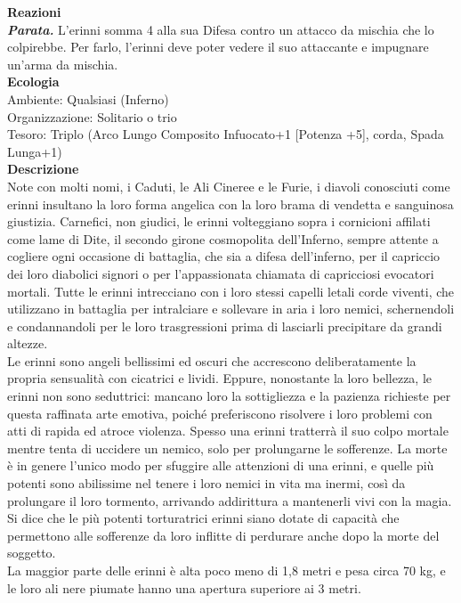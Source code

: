 \begin{multicols}{2}
\textbf{Reazioni}\\
\emph{\textbf{Parata.}} L'erinni somma 4 alla sua Difesa contro un attacco da mischia che lo colpirebbe. Per farlo, l'erinni deve poter vedere il suo attaccante e impugnare un'arma da mischia.\\
\textbf{Ecologia}\\
Ambiente: Qualsiasi (Inferno)\\
Organizzazione: Solitario o trio\\
Tesoro: Triplo (Arco Lungo Composito Infuocato+1 [Potenza +5], corda, Spada Lunga+1)\\
\textbf{Descrizione}\\
Note con molti nomi, i Caduti, le Ali Cineree e le Furie, i diavoli conosciuti come erinni insultano la loro forma angelica con la loro brama di vendetta e sanguinosa giustizia. Carnefici, non giudici, le erinni volteggiano sopra i cornicioni affilati come lame di Dite, il secondo girone cosmopolita dell’Inferno, sempre attente a cogliere ogni occasione di battaglia, che sia a difesa dell’inferno, per il capriccio dei loro diabolici signori o per l’appassionata chiamata di capricciosi evocatori mortali. Tutte le erinni intrecciano con i loro stessi capelli letali corde viventi, che utilizzano in battaglia per intralciare e sollevare in aria i loro nemici, schernendoli e condannandoli per le loro trasgressioni prima di lasciarli precipitare da grandi altezze.\\
Le erinni sono angeli bellissimi ed oscuri che accrescono deliberatamente la propria sensualità con cicatrici e lividi. Eppure, nonostante la loro bellezza, le erinni non sono seduttrici: mancano loro la sottigliezza e la pazienza richieste per questa raffinata arte emotiva, poiché preferiscono risolvere i loro problemi con atti di rapida ed atroce violenza. Spesso una erinni tratterrà il suo colpo mortale mentre tenta di uccidere un nemico, solo per prolungarne le sofferenze. La morte è in genere l’unico modo per sfuggire alle attenzioni di una erinni, e quelle più potenti sono abilissime nel tenere i loro nemici in vita ma inermi, così da prolungare il loro tormento, arrivando addirittura a mantenerli vivi con la magia. Si dice che le più potenti torturatrici erinni siano dotate di capacità che permettono alle sofferenze da loro inflitte di perdurare anche dopo la morte del soggetto.\\
La maggior parte delle erinni è alta poco meno di 1,8 metri e pesa circa 70 kg, e le loro ali nere piumate hanno una apertura superiore ai 3 metri.\\


\end{multicols}
